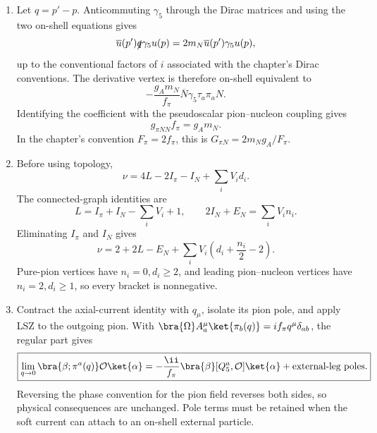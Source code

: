 \begin{enumerate}
  \begin{enumerate}
    \item[(a)]
    Let \(q=p'-p\).  Anticommuting \(\gamma_5\) through the Dirac matrices
    and using the two on-shell equations gives
    \[
      \overline u(p')\slashed q\gamma_5u(p)
        =2m_N\overline u(p')\gamma_5u(p),
    \]
    up to the conventional factors of \(i\) associated with the chapter's
    Dirac conventions.  The derivative vertex is therefore on-shell
    equivalent to
    \[
      -\frac{g_Am_N}{f_\pi}
        \overline N\gamma_5\tau_a\pi_aN.
    \]
    Identifying the coefficient with the pseudoscalar pion--nucleon
    coupling gives
    \[
      \boxed{g_{\pi NN}f_\pi=g_Am_N.}
    \]
    In the chapter's convention \(F_\pi=2f_\pi\), this is
    \(G_{\pi N}=2m_Ng_A/F_\pi\).
    \item[(b)]
    Before using topology,
    \[
      \nu=4L-2I_\pi-I_N+\sum_iV_id_i.
    \]
    The connected-graph identities are
    \[
      L=I_\pi+I_N-\sum_iV_i+1,\qquad
      2I_N+E_N=\sum_iV_in_i.
    \]
    Eliminating \(I_\pi\) and \(I_N\) gives
    \[
      \boxed{\nu
        =2+2L-E_N+\sum_iV_i
         \left(d_i+\frac{n_i}{2}-2\right).}
    \]
    Pure-pion vertices have \(n_i=0,d_i\geq2\), and leading
    pion--nucleon vertices have \(n_i=2,d_i\geq1\), so every bracket is
    nonnegative.
    \item[(c)]
    Contract the axial-current identity with \(q_\mu\), isolate its pion
    pole, and apply LSZ to the outgoing pion.  With
    \(\bra{\Omega}A^\mu_a\ket{\pi_b(q)}=if_\pi q^\mu\delta_{ab}\),
    the regular part gives
    \[
      \boxed{
      \lim_{q\to0}
      \bra{\beta;\pi^a(q)}\mathcal O\ket{\alpha}
        =-\frac{\ii}{f_\pi}
         \bra{\beta}[Q_5^a,\mathcal O]\ket{\alpha}
         +\text{external-leg poles}.}
    \]
    Reversing the phase convention for the pion field reverses both sides,
    so physical consequences are unchanged.  Pole terms must be retained
    when the soft current can attach to an on-shell external particle.
  \end{enumerate}


\end{enumerate}
